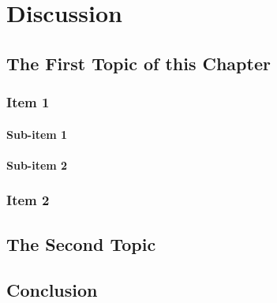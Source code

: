 \chapter{Discussion}
\label{cha:discussion}
\lipsum[79]

\section{The First Topic of this Chapter}
\subsection{Item 1}
\subsubsection{Sub-item 1}
\lipsum[80]

\subsubsection{Sub-item 2}
\lipsum[81]

\subsection{Item 2}
\lipsum[82]

\section{The Second Topic}
\lipsum[83-85]

\section{Conclusion}
\lipsum[86-88]

